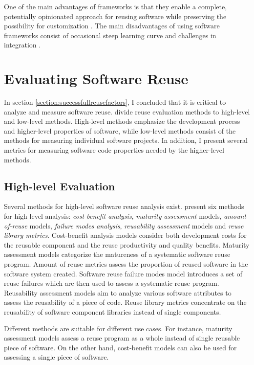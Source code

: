 One of the main advantages of frameworks is that they enable a complete, potentially opinionated approach for reusing software while preserving the possibility for customization \citep{johnson_frameworkscomponents+_1997}. The main disadvantages of using software frameworks consist of occasional steep learning curve and challenges in integration \citep{fayad_object-oriented_1997}.

\section{Evaluating Software Reuse}
\label{section:evaluatingreuse}

In section \ref{section:successfullreusefactors}, I concluded that it is critical to analyze and measure software reuse. \citet{frakes_software_1996} divide reuse evaluation methods to high-level and low-level methods. High-level methods emphasize the development process and higher-level properties of software, while low-level methods consist of the methods for measuring individual software projects. In addition, I present several metrics for measuring software code properties needed by the higher-level methods.

\subsection{High-level Evaluation}

Several methods for high-level software reuse analysis exist. \citet{frakes_software_1996} present six methods for high-level analysis: \emph{cost-benefit analysis}, \emph{maturity assessment} models, \emph{amount-of-reuse} models, \emph{failure modes analysis}, \emph{reusability assessment} models and \emph{reuse library metrics}. Cost-benefit analysis models consider both development costs for the reusable component and the reuse productivity and quality benefits. Maturity assessment models categorize the matureness of a systematic software reuse program. Amount of reuse metrics assess the proportion of reused software in the software system created. Software reuse failure modes model introduces a set of reuse failures which are then used to assess a systematic reuse program. Reusability assessment models aim to analyze various software attributes to assess the reusability of a piece of code. Reuse library metrics concentrate on the reusability of software component libraries instead of single components.

Different methods are suitable for different use cases. For instance, maturity assessment models assess a reuse program as a whole instead of single reusable piece of software. On the other hand, cost-benefit models can also be used for assessing a single piece of software.

